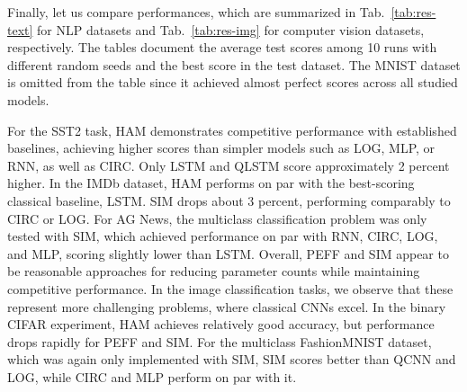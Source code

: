 \documentclass[../main.tex]{subfiles}
\begin{document}
Finally, let us compare performances, which are summarized in Tab.~\ref{tab:res-text} for NLP datasets and Tab.~\ref{tab:res-img} for computer vision datasets, respectively. The tables document the average test scores among 10 runs with different random seeds and the best score in the test dataset. The MNIST dataset is omitted from the table since it achieved almost perfect scores across all studied models.

For the SST2 task, HAM demonstrates competitive performance with established baselines, achieving higher scores than simpler models such as LOG, MLP, or RNN, as well as CIRC. Only LSTM and QLSTM score approximately 2 percent higher. In the IMDb dataset, HAM performs on par with the best-scoring classical baseline, LSTM. SIM drops about 3 percent, performing comparably to CIRC or LOG. For AG News, the multiclass classification problem was only tested with SIM, which achieved performance on par with RNN, CIRC, LOG, and MLP, scoring slightly lower than LSTM. Overall, PEFF and SIM appear to be reasonable approaches for reducing parameter counts while maintaining competitive performance. 
In the image classification tasks, we observe that these represent more challenging problems, where classical CNNs excel. In the binary CIFAR experiment, HAM achieves relatively good accuracy, but performance drops rapidly for PEFF and SIM. For the multiclass FashionMNIST dataset, which was again only implemented with SIM, SIM scores better than QCNN and LOG, while CIRC and MLP perform on par with it.
\end{document}
